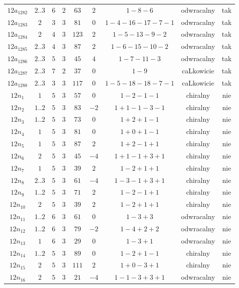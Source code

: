 \begin{longtable}{ccccccccc}
$12a_{1282}$ & $2..3$ & $6$ & $2$ & $63$ & $2$ & $1-8-6$ & odwracalny & tak \\
$12a_{1283}$ & $2$ & $3$ & $3$ & $81$ & $0$ & $1-4-16-17-7-1$ & odwracalny & tak \\
$12a_{1284}$ & $2$ & $4$ & $3$ & $123$ & $2$ & $1-5-13-9-2$ & odwracalny & tak \\
$12a_{1285}$ & $2..3$ & $4$ & $3$ & $87$ & $2$ & $1-6-15-10-2$ & odwracalny & tak \\
$12a_{1286}$ & $2..3$ & $5$ & $3$ & $45$ & $4$ & $1-7-11-3$ & odwracalny & tak \\
$12a_{1287}$ & $2..3$ & $7$ & $2$ & $37$ & $0$ & $1-9$ & caLkowicie & tak \\
$12a_{1288}$ & $2..3$ & $3$ & $3$ & $117$ & $0$ & $1-5-18-18-7-1$ & caLkowicie & tak \\
$12n_{1}$ & $1$ & $5$ & $3$ & $57$ & $0$ & $1-2-1-1$ & chiralny & nie \\
$12n_{2}$ & $1..2$ & $5$ & $3$ & $83$ & $-2$ & $1+1-1-3-1$ & chiralny & nie \\
$12n_{3}$ & $1..2$ & $5$ & $3$ & $73$ & $0$ & $1+2+1-1$ & chiralny & nie \\
$12n_{4}$ & $1$ & $5$ & $3$ & $81$ & $0$ & $1+0+1-1$ & chiralny & nie \\
$12n_{5}$ & $1$ & $5$ & $3$ & $87$ & $2$ & $1+2-1+1$ & chiralny & nie \\
$12n_{6}$ & $2$ & $5$ & $3$ & $45$ & $-4$ & $1+1-1+3+1$ & chiralny & nie \\
$12n_{7}$ & $1$ & $5$ & $3$ & $39$ & $2$ & $1-2+1+1$ & chiralny & nie \\
$12n_{8}$ & $2..3$ & $5$ & $3$ & $61$ & $-4$ & $1-3-1+3+1$ & chiralny & nie \\
$12n_{9}$ & $1..2$ & $5$ & $3$ & $71$ & $2$ & $1-2-1+1$ & chiralny & nie \\
$12n_{10}$ & $2$ & $5$ & $3$ & $39$ & $2$ & $1-2+1+1$ & chiralny & nie \\
$12n_{11}$ & $1..2$ & $6$ & $3$ & $61$ & $0$ & $1-3+3$ & odwracalny & nie \\
$12n_{12}$ & $1..2$ & $6$ & $3$ & $79$ & $-2$ & $1-4+2+2$ & odwracalny & nie \\
$12n_{13}$ & $1$ & $6$ & $3$ & $29$ & $0$ & $1-3+1$ & odwracalny & nie \\
$12n_{14}$ & $1..2$ & $5$ & $3$ & $89$ & $0$ & $1-2+1-1$ & chiralny & nie \\
$12n_{15}$ & $2$ & $5$ & $3$ & $111$ & $2$ & $1+0-3+1$ & chiralny & nie \\
$12n_{16}$ & $2$ & $5$ & $3$ & $21$ & $-4$ & $1-1-3+3+1$ & odwracalny & nie \\

\end{longtable}
